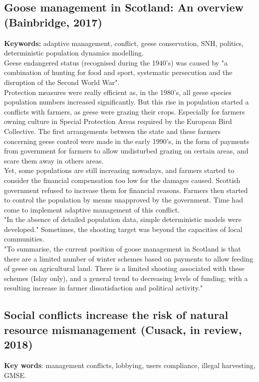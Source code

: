 \documentclass[12pt]{article}
\begin{document}
\subsection{Goose management in Scotland: An overview (Bainbridge, 2017)}
\textbf{Keywords:} adaptive management, conflict, geese conservation, SNH, politics, deterministic population dynamics modelling.\\

Geese endangered status (recognised during the 1940's) was caused by "a combination of
hunting for food and sport, systematic persecution and the
disruption of the Second World War".\\
Protection measures were really efficient as, in the 1980's, all geese species population numbers increased significantly.
But this rise in population started a conflicts with farmers, as geese were grazing their crops.
Especially for farmers owning culture in Special Protection Areas required by the European Bird Collective.
The first arrangements between the state and these farmers concerning geese control were made in the early 1990's, in the form of payments from government for farmers to allow undisturbed grazing on certain areas, and scare them away in others areas.\\
Yet, some populations are still increasing nowadays, and farmers started to consider the financial compensation too low for the damages caused.
Scottish government refused to increase them for financial reasons.
Farmers then started to control the population by means unapproved by the government.
Time had come to implement adaptive management of this conflict.\\	
"In the absence of detailed population data, simple
deterministic models were developed." Sometimes, the shooting target was beyond the capacities of local communities.\\
"To summarise, the current position of goose management in Scotland is that there are a limited number of
winter schemes based on payments to allow feeding of
geese on agricultural land. There is a limited shooting
associated with these schemes (Islay only), and a general
trend to decreasing levels of funding; with a resulting
increase in farmer dissatisfaction and political activity."\\

\subsection{Social conflicts increase the risk of natural resource mismanagement (Cusack, in review, 2018)}
\textbf{Key words}: management conflicts, lobbying, users compliance, illegal harvesting, GMSE.\\
\end{document}
